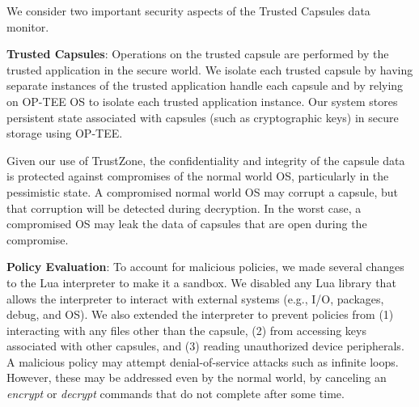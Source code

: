 We consider two important security aspects of the Trusted Capsules data monitor.

\textbf{Trusted Capsules}: Operations on the trusted capsule are performed by
the trusted application in the secure world. We isolate each trusted capsule by
having separate instances of the trusted application handle each capsule and
by relying on OP-TEE OS to isolate each trusted application instance. 
Our system stores persistent state associated with capsules (such as cryptographic keys)
in secure storage using OP-TEE.

Given our use of TrustZone, the confidentiality and integrity of the capsule
data is protected against compromises of the normal world OS, particularly in
the pessimistic state. A compromised normal world OS may corrupt a capsule, but
that corruption will be detected during decryption. In the worst case, a compromised OS
may leak the data of capsules that are open during the compromise.

\textbf{Policy Evaluation}: To account for malicious policies, we made several
changes to the Lua interpreter to make it a sandbox. We disabled any Lua library
that allows the interpreter to interact with external systems (e.g., I/O,
packages, debug, and OS). We also extended the interpreter to prevent policies
from (1) interacting with any files other than the capsule, (2) from accessing
keys associated with other capsules, and (3) reading unauthorized device
peripherals. A malicious policy may attempt denial-of-service attacks such as
infinite loops. However, these may be addressed even by the normal world, by
canceling an {\em encrypt} or {\em decrypt} commands that do not complete after
some time.
